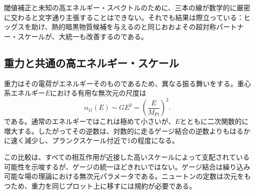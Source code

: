 \begin{classroomqa}
\end{classroomqa}

閾値補正と未知の高エネルギー・スペクトルのために、三本の線が数学的に厳密に交わると文字通り主張することはできない。それでも結果は際立っている：ヒッグスを助け、熱的暗黒物質候補を与えるのと同じおおよその超対称パートナー・スケールが、大統一も改善するのである。

\subsection{重力と共通の高エネルギー・スケール}

重力はその電荷がエネルギーそのものであるため、異なる振る舞いをする。重心系エネルギー\(E\)における有用な無次元の尺度は
\begin{equation}
\alpha_G(E)\sim GE^2
=\left(\frac{E}{M_{\mathrm{Pl}}}\right)^2.
\end{equation}
である。通常のエネルギーではこれは極めて小さいが、\(E\)とともに二次関数的に増大する。したがってその逆数は、対数的に走るゲージ結合の逆数よりもはるかに速く減少し、プランクスケール付近で1の程度になる。

この比較は、すべての相互作用が近接した高いスケールによって支配されている可能性を示唆するが、ゲージの統一ほどきれいではない。ゲージ結合は繰り込み可能な場の理論における無次元パラメータである。ニュートンの定数は次元をもつため、重力を同じプロット上に移すには規約が必要である。

\begin{classroomqa}
\end{classroomqa}

\begin{classroomqa}
\end{classroomqa}

